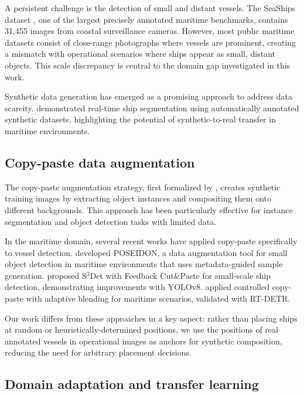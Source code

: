 \documentclass[a4paper,fleqn]{cas-dc}
\begin{document}
A persistent challenge is the detection of small and distant vessels. The SeaShips dataset \citep{shao2018seaships}, one of the largest precisely annotated maritime benchmarks, contains 31,455 images from coastal surveillance cameras. However, most public maritime datasets consist of close-range photographs where vessels are prominent, creating a mismatch with operational scenarios where ships appear as small, distant objects. This scale discrepancy is central to the domain gap investigated in this work.

Synthetic data generation has emerged as a promising approach to address data scarcity. \citet{ribeiro2022synthetic} demonstrated real-time ship segmentation using automatically annotated synthetic datasets, highlighting the potential of synthetic-to-real transfer in maritime environments.

\subsection{Copy-paste data augmentation}

The copy-paste augmentation strategy, first formalized by \citet{ghiasi2021simple}, creates synthetic training images by extracting object instances and compositing them onto different backgrounds. This approach has been particularly effective for instance segmentation and object detection tasks with limited data.

In the maritime domain, several recent works have applied copy-paste specifically to vessel detection. \citet{ruizponce2023poseidon} developed POSEIDON, a data augmentation tool for small object detection in maritime environments that uses metadata-guided sample generation. \citet{li2024s3det} proposed S$^3$Det with Feedback Cut\&Paste for small-scale ship detection, demonstrating improvements with YOLOv8. \citet{nemati2025maritime} applied controlled copy-paste with adaptive blending for maritime scenarios, validated with RT-DETR.

Our work differs from these approaches in a key aspect: rather than placing ships at random or heuristically-determined positions, we use the positions of real annotated vessels in operational images as anchors for synthetic composition, reducing the need for arbitrary placement decisions.

\subsection{Domain adaptation and transfer learning}
\end{document}
